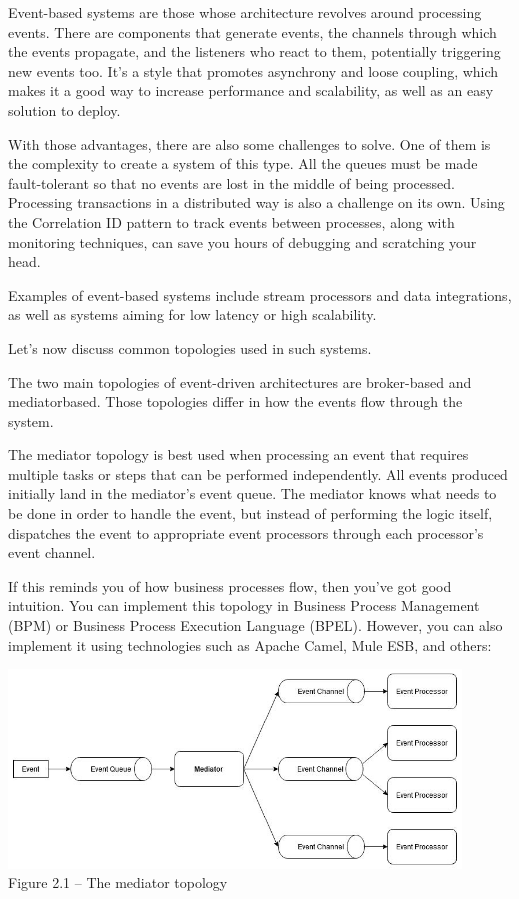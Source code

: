 
Event-based systems are those whose architecture revolves around processing events. There are components that generate events, the channels through which the events propagate, and the listeners who react to them, potentially triggering new events too. It's a style that promotes asynchrony and loose coupling, which makes it a good way to increase performance and scalability, as well as an easy solution to deploy.

With those advantages, there are also some challenges to solve. One of them is the complexity to create a system of this type. All the queues must be made fault-tolerant so that no events are lost in the middle of being processed. Processing transactions in a distributed way is also a challenge on its own. Using the Correlation ID pattern to track events between processes, along with monitoring techniques, can save you hours of debugging and scratching your head.

Examples of event-based systems include stream processors and data integrations, as well as systems aiming for low latency or high scalability.

Let's now discuss common topologies used in such  systems.



The two main topologies of event-driven architectures are broker-based and mediatorbased. Those topologies differ in how the events flow through the system.

The mediator topology is best used when processing an event that requires multiple tasks or steps that can be performed independently. All events produced initially land in the mediator's event queue. The mediator knows what needs to be done in order to handle the event, but instead of performing the logic itself, dispatches the event to appropriate event processors through each processor's event channel. 

If this reminds you of how business processes flow, then you've got good intuition. You can implement this topology in Business Process Management (BPM) or Business Process Execution Language (BPEL). However, you can also implement it using technologies such as Apache Camel, Mule ESB, and others:


\begin{center}
\includegraphics[width=0.9\textwidth]{content/1/chapter2/images/1.jpg}\\
Figure 2.1 – The mediator topology
\end{center}

